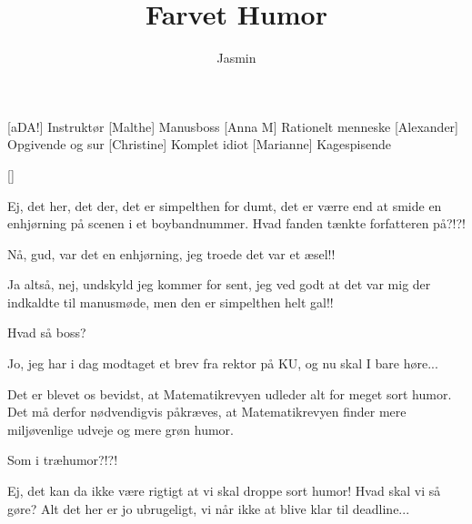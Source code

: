 \documentclass[a4paper,11pt]{article}
\title{Farvet Humor}
\author{Jasmin}
\begin{document}
\maketitle

\begin{roles}
[aDA!] Instruktør
[Malthe] Manusboss
[Anna M] Rationelt menneske
[Alexander] Opgivende og sur
[Christine] Komplet idiot
[Marianne] Kagespisende
\end{roles}

\begin{props}
[]
\end{props}
  
\begin{sketch}

 Ej, det her, det der, det er simpelthen for dumt, det er værre end at smide en enhjørning på scenen i et boybandnummer. Hvad fanden tænkte forfatteren på?!?!

 Nå, gud, var det en enhjørning, jeg troede det var et æsel!!


 Ja altså, nej, undskyld jeg kommer for sent, jeg ved godt at det var mig der indkaldte til manusmøde, men den er simpelthen helt gal!!

 Hvad så boss?

 Jo, jeg har i dag modtaget et brev fra rektor på KU, og nu skal I bare høre...


 Det er blevet os bevidst, at Matematikrevyen udleder alt for meget sort humor. Det må derfor nødvendigvis påkræves, at Matematikrevyen finder mere miljøvenlige udveje og mere grøn humor.

 Som i træhumor?!?!

 Ej, det kan da ikke være rigtigt at vi skal droppe sort humor! Hvad skal vi så gøre? Alt det her er jo ubrugeligt, vi når ikke at blive klar til deadline...


\end{sketch}
\end{document}
